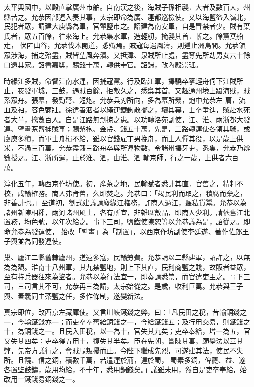 \begin{pinyinscope}
 太平興國中，以殿直掌廣州市舶。自南漢之後，海賊子孫相襲，大者及數百人，州縣苦之。允恭因部運入奏其事，太宗即命為廣、連都巡檢使。又以海鹽盜入嶺北，民犯者眾，請建大庾縣為軍，官輦鹽市之。詔建為南安軍，自是冒禁者少。賊有葉氏者，眾五百餘，往來海上。允恭集水軍，造輕舠，掩襲其首，斬之。餘黨棄船走，
 伏匿山谷，允恭伐木開道，悉殲焉。賊寇每遇風濤，則遁止洲島間。允恭領眾涉海，捕之殆盡，賊皆望風奔潰。又抵漳、泉賊所止處，盡奪先所劫男女六十餘口還其家。詔書嘉獎，賜錢十萬，轉供奉官。詔歸，改內殿崇班。



 時緣江多賊，命督江南水運，因捕寇黨。行及臨江軍，擇驍卒拏輕舟伺下江賊所止，夜發軍城，三鼓，遇賊百餘，拒敵久之，悉梟其首。又趣通州境上躡海賊，賊系眾舟。張幕，發勁弩、短炮。允恭兵刃所向，多為幕所縈，炮中允恭左
 肩，流血及袖，容色彌壯。徐遣善泅者以繩連鐵鉤散擲之，壞其幕，士卒爭進，賊赴水死者大半，擒數百人。自是江路無剽掠之患。以功轉洛苑副使，江、淮、兩浙都大發運、擘畫茶鹽捕賊事；賜紫袍、金帶、錢五十萬。先是，三路轉運使各領其職，或廩庾多積，而軍士舟楫不給，雖以官錢雇丁男挽舟，而土人憚其役，以是歲上供米，不過三百萬。允恭盡籍三路舟卒與所運物數，令諸州擇牙吏，悉集，允恭乃辨數授之。江、浙所運，止於淮、泗，由淮、泗
 輸京師，行之一歲，上供者六百萬。



 淳化五年，轉西京作坊使。初，產茶之地，民輸賦者悉計其直，官售之，精粗不校，咸輸榷務。商人弗肯售，久即焚之。允恭曰：「竭民利而取之，積腐而棄之，非善計也。」至道初，劉式建議請廢緣江榷務，許商人過江，聽私貨鬻。允恭以為諸州新陳相糅，兩河諸州風土，各有所宜，非雜以數品，即商人少利。請依舊江北置務，均色號，以年次給之。事下三司，鹽鐵使陳恕等以允恭議為是，詔從之。即命允恭為發運使，
 始改「擘畫」為「制置」，以西京作坊副使李廷遂、著作佐郎王子輿並為同發運使。



 巢、廬江二縣舊隸廬州，道遠多寇，民輸勞費。允恭請以二縣建軍，詔許之，以無為為額。淮南十八州軍，其九禁鹽地，則上下其直，民利商鹽之賤，故販者益眾，至有持兵器往來為盜者。允恭以為行法宜一，即奏請悉禁，而官遣吏主之。事下三司，三司言其不可，允恭再三為請，太宗始從之。是歲，收利巨萬。允恭與王子輿、秦羲同主茶鹽之任，多作條制，遂變新法。



 真宗即位，改西京左藏庫使。又言川峽鐵錢之弊，曰：「凡民田之稅，昔輸銅錢之一，今輸鐵錢亦一；而吏卒奉舊給銅錢之一，今給鐵錢五；及行用交易，則鐵錢之十，為銅錢之一。且民入田稅，以一為十，官失其九矣；吏卒奉給，增一為五，官又失其四矣；吏卒得五用十，復失其半矣。臣在先朝，嘗陳其事，願變法以革其弊，先帝方議行之，會賊順叛擾而止。今陛下繼成先烈，可遂建其法，使民不失所。且饒、信之銅，積數千萬，若遣運於荊，達於蜀，
 蜀素多銅，俾夔、益、遂各置監鼓鑄，歲用均給，不十年，悉用銅錢矣。」議雖未用，然自是吏卒奉給，始改用十鐵錢易銅錢之一。




\end{pinyinscope}
